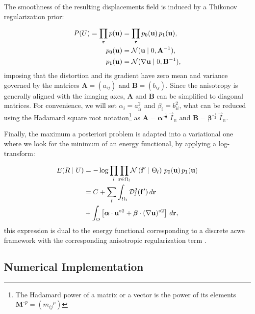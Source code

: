 The smoothness of the resulting displacements field is induced by a Thikonov regularization
  prior:

  \begin{align*}
  P(U) = \underset{\vec{r}}{\prod}\, p(\vec{u}) &=
  \underset{\vec{r}}{\prod}\, p_0(\vec{u}) \, p_1(\vec{u}), \\
  p_0(\vec{u}) &= \mathcal{N}( \vec{u} \mid 0, \mathbf{A}^{-1}), \notag\\
  p_1(\vec{u}) &= \mathcal{N}(  \nabla \vec{u} \mid 0, \mathbf{B}^{-1}),
  \end{align*}
%
  imposing that the distortion and its gradient have zero
  mean and variance governed by the matrices $\mathbf{A} = (a_{ij})$ and $\mathbf{B} = (b_{ij})$.
Since the anisotropy is generally aligned with the imaging axes, $\mathbf{A}$ and $\mathbf{B}$
  can be simplified to diagonal matrices.
For convenience, we will set $\alpha_i = a_{ii}^2$ and $\beta_i = b_{ii}^2$, what can be reduced
  using the Hadamard square root notation\footnote{The Hadamard power of a matrix or a vector
  is the power of its elements $\mathbf{M}^{\circ p} = ({m_{ij}}^{p})$} as
  $\mathbf{A}=\boldsymbol{\alpha}^{\circ\frac12}\,\vec{I}_n$ and
  $\mathbf{B}=\boldsymbol{\beta}^{\circ\frac12}\,\vec{I}_n$.


Finally, the maximum a posteriori problem is adapted into a variational one where we look for
  the minimum of an energy functional, by applying a log-transform:

  \begin{align}
  E(R \mid U) &= -\log \underset{l}{\prod}
  \underset{\vec{r} \in \Omega_l}{\prod}
  \mathcal{N} \left( \vec{f}' \mid \Theta_l \right)\,p_0( \vec{u})\,p_1( \vec{u}) \notag\\
  &= C + \underset{l}{\sum} \int_{\Omega_l}
  \mdist{f'}{l} \,d\vec{r} \notag\\
  &+ \int_{\Omega} \left[ \boldsymbol{\alpha} \cdot \vec{u}^{\circ2}
  + \boldsymbol{\beta} \cdot (\nabla \vec{u})^{\circ2} \right] \,d\vec{r},
  \label{eq:energy}
  \end{align}
%
  this expression is dual to the energy functional corresponding
  to a discrete \gls*{acwe} framework \citep{chan_active_2001}
  with the corresponding anisotropic regularization term \citep{nagel_investigation_1986}.


\subsection{Numerical Implementation}
\label{sec:numerical_implementation}

